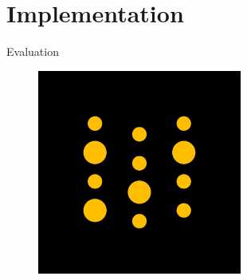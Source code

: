 \documentclass[10pt]{beamer}
\begin{document}
  \section{Implementation}
  \begin{frame}{Evaluation}
    \begin{figure}
      \centering
      \href{https://bit.ly/3yIZQC4}{\includegraphics[width=0.6\textwidth]{images/wandb.png}}
    \end{figure}
  \end{frame}
\end{document}
